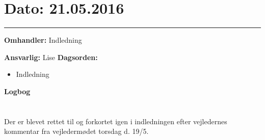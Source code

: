 

\section{Dato: 21.05.2016}
\hrule

\textbf{Omhandler:} Indledning

\textbf{Ansvarlig:} Lise 
\textbf{Dagsorden:}
\begin{itemize}
	\item Indledning
\end{itemize}

\textbf{Logbog}
\\
\\ \\
Der er blevet rettet til og forkortet igen i indledningen efter vejledernes kommentar fra vejledermødet torsdag d. 19/5. 


